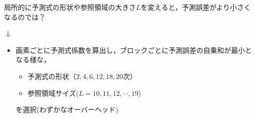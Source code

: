 \documentclass[25pt, landscape,dvipdfmx]{foils}
\begin{document}
\newpage
局所的に予測式の形状や参照領域の大きさ$L$を変えると，予測誤差がより小さくなるのでは？
\begin{center}
$\Downarrow$
\end{center}
\begin{itemize}
\item \large 画素ごとに予測式係数を算出し，ブロックごとに予測誤差の自乗和が最小となる様な，
\begin{itemize}
  \item 予測式の形状（$2,4,6,12,18,20$次）
  \item 参照領域サイズ($L=10,11,12,\cdots,19$)
 \end{itemize}
を選択(わずかなオーバーヘッド)\\
\end{itemize}

\newpage
\end{document}
